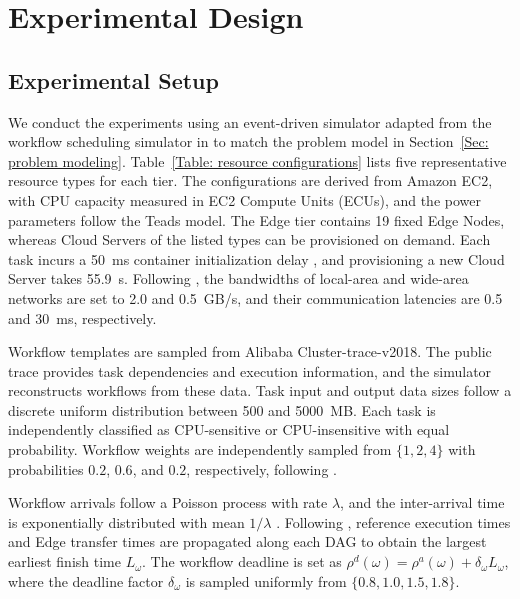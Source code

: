 \documentclass[10pt,journal]{IEEEtran}
\begin{document}
\section{Experimental Design}
\label{Sec: experimental design}

\subsection{Experimental Setup}
\label{Sec: experimental environment}

We conduct the experiments using an event-driven simulator adapted from the workflow scheduling simulator in \cite{ccgp} to match the problem model in Section~\ref{Sec: problem modeling}.
Table~\ref{Table: resource configurations} lists five representative resource types for each tier. The configurations are derived from Amazon EC2\footnotemark[1], with CPU capacity measured in EC2 Compute Units (ECUs), and the power parameters follow the Teads model\footnotemark[2]. The Edge tier contains 19 fixed Edge Nodes, whereas Cloud Servers of the listed types can be provisioned on demand. Each task incurs a 50~ms container initialization delay \cite{Ranjan2020}, and provisioning a new Cloud Server takes 55.9~s. Following \cite{Goudarzi2021,Pallewatta2022}, the bandwidths of local-area and wide-area networks are set to 2.0 and 0.5~GB/s, and their communication latencies are 0.5 and 30~ms, respectively.

Workflow templates are sampled from Alibaba Cluster-trace-v2018\footnotemark[3]. The public trace provides task dependencies and execution information, and the simulator reconstructs workflows from these data. Task input and output data sizes follow a discrete uniform distribution between 500 and 5000~MB. Each task is independently classified as CPU-sensitive or CPU-insensitive with equal probability. Workflow weights are independently sampled from $\{1,2,4\}$ with probabilities $0.2$, $0.6$, and $0.2$, respectively, following \cite{Hi2015ousgp}.

Workflow arrivals follow a Poisson process with rate $\lambda$, and the inter-arrival time is exponentially distributed with mean $1/\lambda$ \cite{Sahoo2021}. Following \cite{ccgp}, reference execution times and Edge transfer times are propagated along each DAG to obtain the largest earliest finish time $L_{\omega}$. The workflow deadline is set as $\rho^d(\omega)=\rho^a(\omega)+\delta_{\omega}L_{\omega}$, where the deadline factor $\delta_{\omega}$ is sampled uniformly from $\{0.8,1.0,1.5,1.8\}$.
\end{document}
